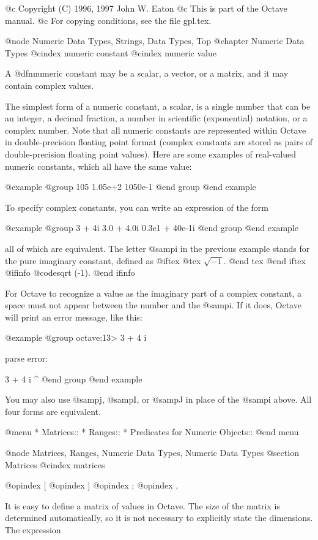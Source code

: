 @c Copyright (C) 1996, 1997 John W. Eaton
@c This is part of the Octave manual.
@c For copying conditions, see the file gpl.tex.

@node Numeric Data Types, Strings, Data Types, Top
@chapter Numeric Data Types
@cindex numeric constant
@cindex numeric value

A @dfn{numeric constant} may be a scalar, a vector, or a matrix, and it
may contain complex values.

The simplest form of a numeric constant, a scalar, is a single number
that can be an integer, a decimal fraction, a number in scientific
(exponential) notation, or a complex number.  Note that all numeric
constants are represented within Octave in double-precision floating
point format (complex constants are stored as pairs of double-precision
floating point values).  Here are some examples of real-valued numeric
constants, which all have the same value:

@example
@group
105
1.05e+2
1050e-1
@end group
@end example

To specify complex constants, you can write an expression of the form

@example
@group
3 + 4i
3.0 + 4.0i
0.3e1 + 40e-1i
@end group
@end example

all of which are equivalent.  The letter @samp{i} in the previous example
stands for the pure imaginary constant, defined as
@iftex
@tex
  $\sqrt{-1}$.
@end tex
@end iftex
@ifinfo
  @code{sqrt (-1)}.
@end ifinfo

For Octave to recognize a value as the imaginary part of a complex
constant, a space must not appear between the number and the @samp{i}.
If it does, Octave will print an error message, like this:

@example
@group
octave:13> 3 + 4 i

parse error:

  3 + 4 i
        ^
@end group
@end example

You may also use @samp{j}, @samp{I}, or @samp{J} in place of the
@samp{i} above.  All four forms are equivalent.

@menu
* Matrices::                    
* Ranges::                      
* Predicates for Numeric Objects::  
@end menu

@node Matrices, Ranges, Numeric Data Types, Numeric Data Types
@section Matrices
@cindex matrices

@opindex [
@opindex ]
@opindex ;
@opindex ,

It is easy to define a matrix of values in Octave.  The size of the
matrix is determined automatically, so it is not necessary to explicitly
state the dimensions.  The expression

